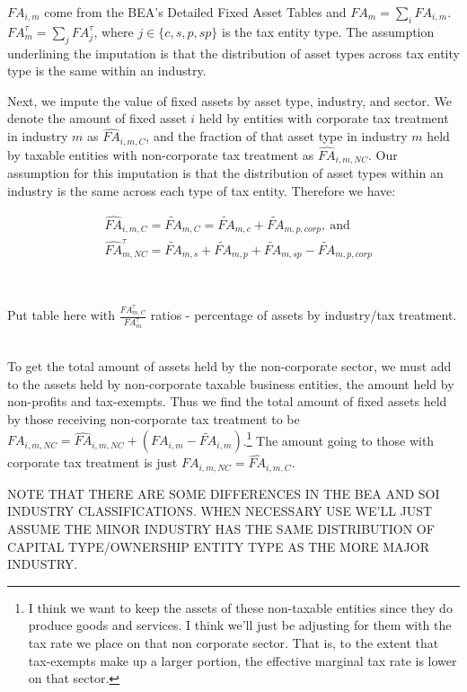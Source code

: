 \documentclass[article,11pt,letterpaper,fleqn]{article}
\theoremstyle{definition}
\numberwithin{equation}{section}
\begin{document}
\noindent\noindent  ${FA}_{i,m}$ come from the BEA's Detailed Fixed Asset Tables and ${FA}_{m}=\sum_{i}{FA}_{i,m}$.  ${FA}^{\tau}_{m}=\sum_{j}{FA}^{\tau}_{j}$, where $j\in\{c,s,p,sp\}$ is the tax entity type.  The assumption underlining the imputation is that the distribution of asset types across tax entity type is the same within an industry.

Next, we impute the value of fixed assets by asset type, industry, and sector.  We denote the amount of fixed asset $i$ held by entities with corporate tax treatment in industry $m$ as $\widehat{FA}_{i,m,C}$, and the fraction of that asset type in industry $m$ held by taxable entities with non-corporate tax treatment as $\widehat{FA}_{i,m,NC}$.  Our assumption for this imputation is that the distribution of asset types within an industry is the same across each type of tax entity.  Therefore we have: 

\begin{align}
& \widehat{FA}_{i,m,C}=\widetilde{FA}_{m,C}=\widetilde{FA}_{m,c}+\widetilde{FA}_{m,p,corp}, \ \text{and} \\
& \widehat{FA}^{\tau}_{m,NC}=\widetilde{FA}_{m,s}+\widetilde{FA}_{m,p}+\widetilde{FA}_{m,sp}-\widetilde{FA}_{m,p,corp}
\end{align} 


\ \\
\begin{center}
Put table here with $\frac{{FA}^{\tau}_{m,C}}{{FA}^{\tau}_{m}}$ ratios - percentage of assets by industry/tax treatment.
\end{center}
\ \\

To get the total amount of assets held by the non-corporate sector, we must add to the assets held by non-corporate taxable business entities, the amount held by non-profits and tax-exempts.  Thus we find the total amount of fixed assets held by those receiving non-corporate tax treatment to be ${FA}_{i,m,NC}=\widehat{FA}_{i,m,NC}+({FA}_{i,m}-\widetilde{FA}_{i,m})$.\footnote{I think we want to keep the assets of these non-taxable entities since they do produce goods and services. I think we'll just be adjusting for them with the tax rate we place on that non corporate sector.  That is, to the extent that tax-exempts make up a larger portion, the effective marginal tax rate is lower on that sector.}  The amount going to those with corporate tax treatment is just ${FA}_{i,m,NC}=\widehat{FA}_{i,m,C}$.

NOTE THAT THERE ARE SOME DIFFERENCES IN THE BEA AND SOI INDUSTRY CLASSIFICATIONS.  WHEN NECESSARY USE WE'LL JUST ASSUME THE MINOR INDUSTRY HAS THE SAME DISTRIBUTION OF CAPITAL TYPE/OWNERSHIP ENTITY TYPE AS THE MORE MAJOR INDUSTRY.
\end{document}
